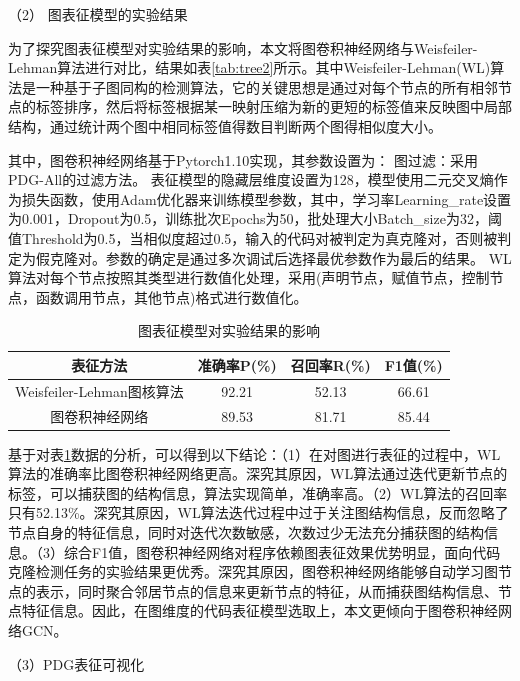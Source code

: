 （2） 图表征模型的实验结果

为了探究图表征模型对实验结果的影响，本文将图卷积神经网络与Weisfeiler-Lehman算法进行对比，结果如表\ref{tab:tree2}所示。其中Weisfeiler-Lehman(WL)算法是一种基于子图同构的检测算法，它的关键思想是通过对每个节点的所有相邻节点的标签排序，然后将标签根据某一映射压缩为新的更短的标签值来反映图中局部结构，通过统计两个图中相同标签值得数目判断两个图得相似度大小\cite{articleWL}。

其中，图卷积神经网络基于Pytorch1.10实现，其参数设置为： 图过滤：采用PDG-All的过滤方法。 表征模型的隐藏层维度设置为128，模型使用二元交叉熵作为损失函数，使用Adam优化器来训练模型参数，其中，学习率Learning\_rate设置为0.001，Dropout为0.5，训练批次Epochs为50，批处理大小Batch\_size为32，阈值Threshold为0.5，当相似度超过0.5，输入的代码对被判定为真克隆对，否则被判定为假克隆对。参数的确定是通过多次调试后选择最优参数作为最后的结果。 WL算法对每个节点按照其类型进行数值化处理，采用(声明节点，赋值节点，控制节点，函数调用节点，其他节点)格式进行数值化。


\begin{table}[htp]  
  \centering  
  \caption{图表征模型对实验结果的影响}   
  \label{tab:graph2}
  \begin{tabular*}{0.9\textwidth}{@{\extracolsep{\fill}}cccc}  
  \toprule  
  表征方法 & 准确率P(\%) & 召回率R(\%) & F1值(\%)  \\  
  \midrule
  Weisfeiler-Lehman图核算法  & 92.21	  & 52.13	 & 66.61		\\  
  图卷积神经网络		         & 89.53		&81.71		&85.44\\ 
  \bottomrule  
  \end{tabular*}  
\end{table}

基于对表\ref{tab:graph2}数据的分析，可以得到以下结论：（1）在对图进行表征的过程中，WL算法的准确率比图卷积神经网络更高。深究其原因，WL算法通过迭代更新节点的标签，可以捕获图的结构信息，算法实现简单，准确率高。（2）WL算法的召回率只有52.13\%。深究其原因，WL算法迭代过程中过于关注图结构信息，反而忽略了节点自身的特征信息，同时对迭代次数敏感，次数过少无法充分捕获图的结构信息。（3）综合F1值，图卷积神经网络对程序依赖图表征效果优势明显，面向代码克隆检测任务的实验结果更优秀。深究其原因，图卷积神经网络能够自动学习图节点的表示，同时聚合邻居节点的信息来更新节点的特征，从而捕获图结构信息、节点特征信息。因此，在图维度的代码表征模型选取上，本文更倾向于图卷积神经网络GCN。

（3）PDG表征可视化


